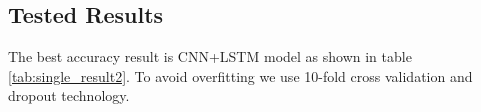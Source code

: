   \subsection{Tested Results}  
  The best accuracy result is CNN+LSTM model as shown in table \ref{tab:single_result2}. To avoid overfitting we use 10-fold cross validation and dropout technology.  
  
 \begin{table}[!h]
 \centering
{}
 \caption{Prediction Accuracy of Different Single Tweet's Creditability Scoring Models }
 \label{tab:single_result2}
\end{table}


